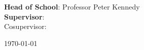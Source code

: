 \begin{titlepage}
\Large \school\\[1.5cm] %
\ifdefined\department
\large \department\\[1cm] %
\fi



\normalsize \textbf{Head of School}: Professor Peter Kennedy\\
\textbf{Supervisor}: \supervisor\\[1cm] %
\ifdefined\cosupervisor
Cosupervisor: \cosupervisor\\ %
\fi


{\large \today}\\[2cm] %

\vspace*{\fill}

\end{titlepage}